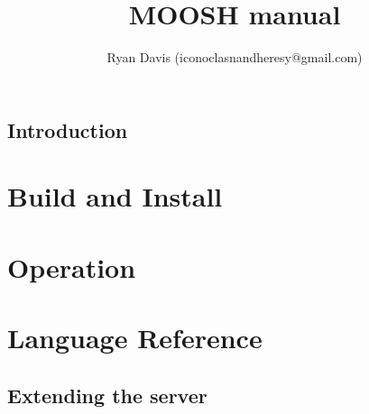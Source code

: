 \documentclass[10pt,twocolumn,letterpaer]{book}
\author{Ryan Davis (iconoclasnandheresy@gmail.com)}
\title{MOOSH manual}
\begin{document}
\maketitle
\frontmatter
\tableofcontets
\chapter{Introduction}

\mainmatter
\part{Build and Install}
\part{Operation}
\part{Language Reference}
\backmatter
\chapter{Extending the server}
\end{document}
